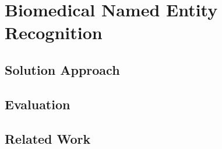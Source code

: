 \chapter{Biomedical Named Entity Recognition}
\label{cha:biomedner}
\section{Solution Approach}
\section{Evaluation}
\section{Related Work}